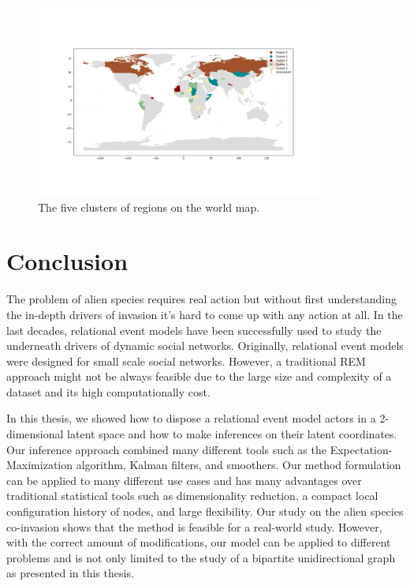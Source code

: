 \documentclass[mscthesis]{usiinfthesis}
\begin{document}
\begin{figure}[ht]
    \centering
    \includegraphics[width=0.85\textwidth]{region_geospatial_cluster.png}
    \caption{The five clusters of regions on the world map.}
    \label{fig:worldmap_cluster}
\end{figure}




\chapter{Conclusion}

The problem of alien species requires real action but without first understanding the in-depth drivers of invasion it's hard to come up with any action at all. In the last decades, relational event models have been successfully used to study the underneath drivers of dynamic social networks. Originally, relational event models were designed for small scale social networks. However, a traditional REM approach might not be always feasible due to the large size and complexity of a dataset and its high computationally cost.

In this thesis, we showed how to dispose a relational event model actors in a 2-dimensional latent space and how to make inferences on their latent coordinates. Our inference approach combined many different tools such as the Expectation-Maximization algorithm, Kalman filters, and smoothers. Our method formulation can be applied to many different use cases and has many advantages over traditional statistical tools such as dimensionality reduction, a compact local configuration history of nodes, and large flexibility. Our study on the alien species co-invasion shows that the method is feasible for a real-world study. However, with the correct amount of modifications, our model can be applied to different problems and is not only limited to the study of a bipartite unidirectional graph as presented in this thesis. 
\end{document}

